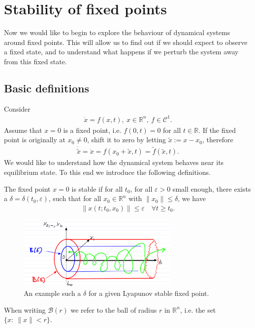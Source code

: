 \chapter{Stability of fixed points}
Now we would like to begin to explore the behaviour of dynamical systems around fixed points. This will allow us to find out if we should expect to observe a fixed state, and to understand what happens if we perturb the system away from this fixed state.
\section{Basic definitions}
Consider
\begin{align}
	\dot{ {x}}=f( {x},t),\  {x} \in \mathbb{R}^{n},\ f\in \mathcal{C}^{1}.
\end{align}
Assume that $ {x}=0$ is a fixed point, i.e. $f({0},t) = {0}$ for all $t \in \mathbb{R}$. If the fixed point is originally at ${x}_0\neq {0}$, shift it to zero by letting $\tilde{ {x}}:= {x}- {x}_0$, therefore 
\begin{align}
	\dot{\tilde{ {x}}} = \dot{ {x}} = f( {x}_0 + \tilde{ {x}}, t) = \tilde{f}(\tilde{ {x}}, t).
\end{align}
We would like to understand how the dynamical system behaves near its equilibrium state. To this end we introduce the following definitions.
\begin{definition} \label{def:stable}
	The fixed point $ {x}={0}$ is stable if for all $t_0$, for all $\varepsilon>0$ small enough, there exists a $\delta=\delta(t_0, \varepsilon)$, such that for all $ {x}_0 \in \mathbb{R}^{n}$ with $\| {x}_0\| \leq \delta$, we have 
	\begin{align}
		\boxed{
			\left \|  {x}(t;t_0,  {x}_0) \right\| \leq \varepsilon \quad \forall t \geq t_0.
		}
	\end{align}
\begin{figure}[h!]
	\centering
	\includegraphics[width=0.7\textwidth]{figures/ch2/1lyapunov_stability.png}
	\caption{An example such a $\delta$ for a given Lyapunov stable fixed point.}
	\label{fig:lyapunov_stability_def}
\end{figure}
\end{definition}
\begin{remark}
	When writing $\mathcal{B}(r)$ we refer to the ball of radius $r$ in $\mathbb{R}^{n}$, i.e. the set $\{x:\ \|x\| < r\}$.
\end{remark}

